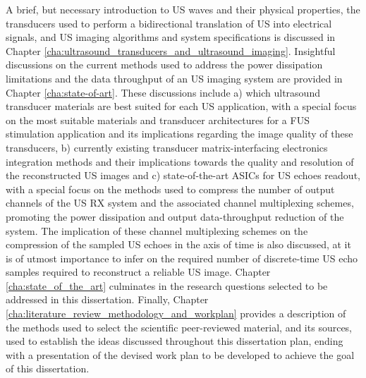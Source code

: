 \par
A brief, but necessary introduction to US waves and their physical properties, the transducers used to perform a bidirectional translation of US into electrical signals, and US imaging algorithms and system specifications is discussed in Chapter \ref{cha:ultrasound_transducers_and_ultrasound_imaging}.  
Insightful discussions on the current methods used to address the power dissipation limitations and the data throughput of an US imaging system are provided in Chapter \ref{cha:state-of-art}.  These discussions include a) which ultrasound transducer materials are best suited for each US application, with a special focus on the most suitable materials and transducer architectures for a FUS stimulation application and its implications regarding the image quality of these transducers, b) currently existing transducer matrix-interfacing electronics integration methods and their implications towards the quality and resolution of the reconstructed US images and c) state-of-the-art ASICs for US echoes readout, with a special focus on the methods used to compress the number of output channels of the US RX system and the associated channel multiplexing schemes, promoting the power dissipation and output data-throughput reduction of the system. The implication of these channel multiplexing schemes on the compression of the sampled US echoes in the axis of time is also discussed, at it is of utmost importance to infer on the required number of discrete-time US echo samples required to reconstruct a reliable US image. Chapter \ref{cha:state_of_the_art} culminates in the research questions selected to be addressed in this dissertation. Finally, Chapter \ref{cha:literature_review_methodology_and_workplan} provides a description of the methods used to select the scientific peer-reviewed material, and its sources, used to establish the ideas discussed throughout this dissertation plan, ending with a presentation of the devised  work plan to be developed to achieve the goal of this dissertation.




